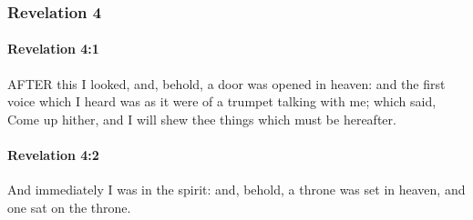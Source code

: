 	\subsubsection{Revelation 4} %
		\label{REVELATIONNT-4}
		
		\paragraph{Revelation 4:1} %
			\label{REVELATIONNT-4-1}

			AFTER this I looked, and, behold, a door was opened in heaven: and the first voice which I heard was as it were of a trumpet talking with me; which said, Come up hither, and I will shew thee things which must be hereafter.

			\begin{framed}
			\scriptsize
				\begin{compactdesc}
					\item[SBLG] 
				\end{compactdesc}
			\end{framed}

		\paragraph{Revelation 4:2} %
			\label{REVELATIONNT-4-2}

			And immediately I was in the spirit: and, behold, a throne was set in heaven, and one sat on the throne.

